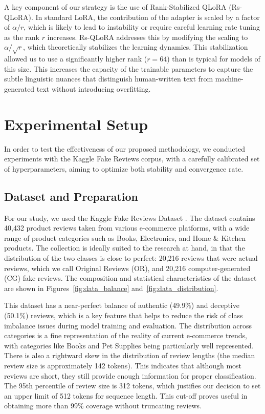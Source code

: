 \documentclass[utf8]{FrontiersinHarvard}
\begin{document}
A key component of our strategy is the use of Rank-Stabilized QLoRA (Rs-QLoRA). In standard LoRA, the contribution of the adapter is scaled by a factor of $\alpha/r$, which is likely to lead to instability or require careful learning rate tuning as the rank $r$ increases. Rs-QLoRA addresses this by modifying the scaling to $\alpha/\sqrt{r}$, which theoretically stabilizes the learning dynamics. This stabilization allowed us to use a significantly higher rank ($r = 64$) than is typical for models of this size. This increases the capacity of the trainable parameters to capture the subtle linguistic nuances that distinguish human-written text from machine-generated text without introducing overfitting.



\section{Experimental Setup}

In order to test the effectiveness of our proposed methodology, we conducted experiments with the Kaggle Fake Reviews corpus, with a carefully calibrated set of hyperparameters, aiming to optimize both stability and convergence rate.

\subsection{Dataset and Preparation}

For our study, we used the Kaggle Fake Reviews Dataset \citep{FakeReviewsDataset}. The dataset contains 40,432 product reviews taken from various e-commerce platforms, with a wide range of product categories such as Books, Electronics, and Home \& Kitchen products. The collection is ideally suited to the research at hand, in that the distribution of the two classes is close to perfect: 20,216 reviews that were actual reviews, which we call Original Reviews (OR), and 20,216 computer-generated (CG) fake reviews. The composition and statistical characteristics of the dataset are shown in Figures~\ref{fig:data_balance} and~\ref{fig:data_distribution}.

This dataset has a near-perfect balance of authentic (49.9\%) and deceptive (50.1\%) reviews, which is a key feature that helps to reduce the risk of class imbalance issues during model training and evaluation. The distribution across categories is a fine representation of the reality of current e-commerce trends, with categories like Books and Pet Supplies being particularly well represented. There is also a rightward skew in the distribution of review lengths (the median review size is approximately 142 tokens). This indicates that although most reviews are short, they still provide enough information for proper classification. The 95th percentile of review size is 312 tokens, which justifies our decision to set an upper limit of 512 tokens for sequence length. This cut-off proves useful in obtaining more than 99\% coverage without truncating reviews.
\end{document}
